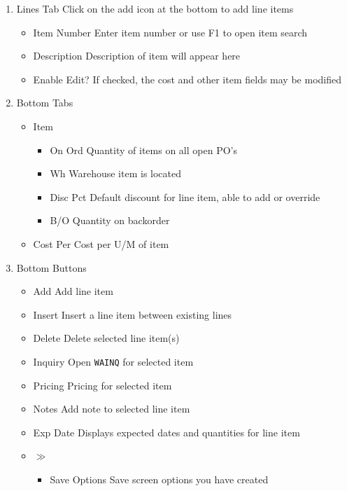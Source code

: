 \begin{enumerate}
	\item Lines Tab \textemdash Click on the add icon at the bottom to add line items
	\begin{itemize}
		\item Item Number \textemdash Enter item number or use F1 to open item search
		\item Description \textemdash Description of item will appear here
		\item Enable Edit? \textemdash If checked, the cost and other item fields may be modified
	\end{itemize}
	\item Bottom Tabs
	\begin{itemize}
		\item Item
		\begin{itemize}
			\item On Ord \textemdash Quantity of items on all open PO's
			\item Wh \textemdash Warehouse item is located
			\item Disc Pct \textemdash Default discount for line item, able to add or override
			\item B/O \textemdash Quantity on backorder
		\end{itemize}
		\item Cost Per \textemdash Cost per U/M of item
	\end{itemize}
	\item Bottom Buttons
	\begin{itemize}
		\item Add \textemdash Add line item
		\item Insert \textemdash Insert a line item between existing lines
		\item Delete \textemdash Delete selected line item(s)
		\item Inquiry \textemdash Open \texttt{WAINQ} for selected item
		\item Pricing \textemdash Pricing for selected item
		\item Notes \textemdash Add note to selected line item
		\item Exp Date \textemdash Displays expected dates and quantities for line item
		\item $\gg$
		\begin{itemize}
			\item Save Options \textemdash Save screen options you have created
		\end{itemize}
	\end{itemize}
	

\end{enumerate}
